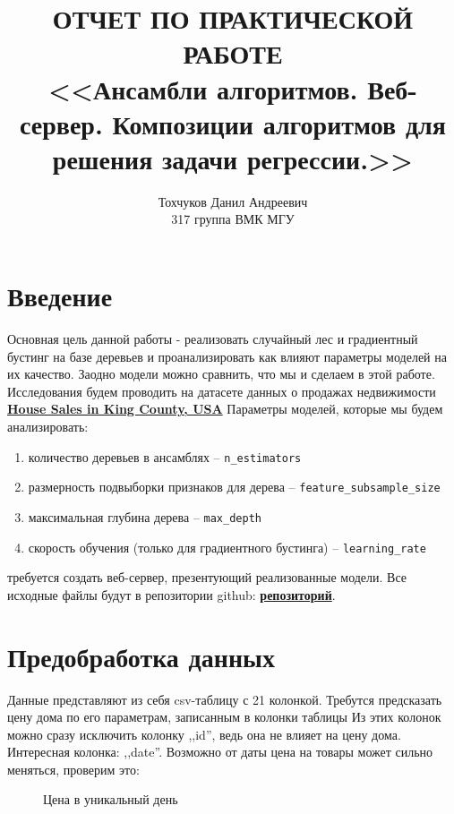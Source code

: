 \documentclass[12pt]{report}
\title{
ОТЧЕТ ПО ПРАКТИЧЕСКОЙ РАБОТЕ \\
<<Ансамбли алгоритмов. Веб-сервер.
Композиции алгоритмов для решения задачи регрессии.>>
}
\author{
    Тохчуков Данил Андреевич \\
    317 группа ВМК МГУ
}
\date{}
\begin{document}
\maketitle
\tableofcontents
\newpage

\section{Введение}
Основная цель данной работы - реализовать случайный лес и градиентный бустинг 
на базе деревьев и проанализировать как влияют 
параметры моделей на их качество. Заодно модели можно сравнить,
что мы и сделаем в этой работе. 
Исследования будем проводить на датасете данных о продажах недвижимости 
\href{https://www.kaggle.com/harlfoxem/housesalesprediction}{\textbf{House Sales in King County, USA}}
Параметры моделей, которые мы будем анализировать:
\begin{enumerate}
    \item количество деревьев в ансамблях -- \verb|n_estimators|
    \item размерность подвыборки признаков для дерева -- \verb|feature_subsample_size|
    \item максимальная глубина дерева -- \verb|max_depth|
    \item скорость обучения (только для градиентного бустинга) -- \verb|learning_rate|
\end{enumerate}

 требуется создать веб-сервер, презентующий реализованные модели.
Все исходные файлы будут в репозитории github: \href{https://github.com/makriot/Ensembles}{\textbf{репозиторий}}.


\section{Предобработка данных}
Данные представляют из себя csv-таблицу с 21 колонкой.
Требутся предсказать цену дома по его параметрам, записанным в колонки таблицы
Из этих колонок можно сразу исключить колонку ,,id'', ведь она не влияет на цену дома.
Интересная колонка: ,,date''. Возможно от даты цена на товары может сильно меняться, 
проверим это:

\begin{figure}[H]
    \begin{center}
        
    \end{center}
    \caption{Цена в уникальный день}\label{fig::1}
\end{figure}
\end{document}
